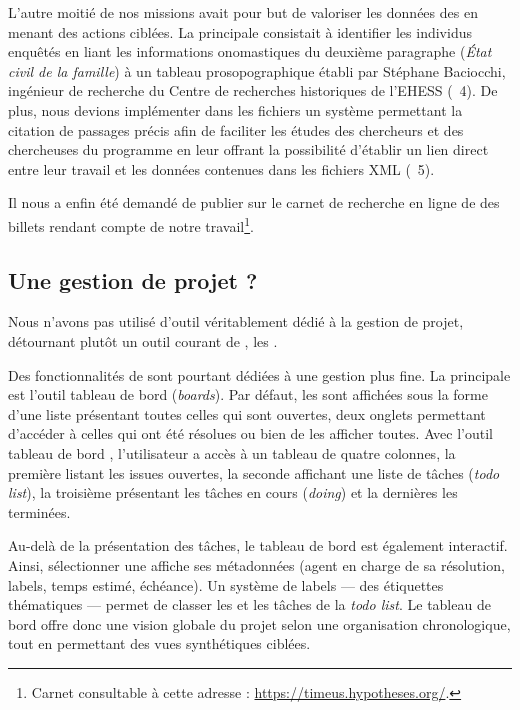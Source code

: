 L'autre moitié de nos missions avait pour but de valoriser les données des \odm{} en menant des actions ciblées. La principale consistait à identifier les individus enquêtés en liant les informations onomastiques du deuxième paragraphe (\textit{État civil de la famille}) à un tableau prosopographique établi par Stéphane Baciocchi, ingénieur de recherche du Centre de recherches historiques de l'EHESS (\issue{}~4). De plus, nous devions implémenter dans les fichiers un système permettant la citation de passages précis afin de faciliter les études des chercheurs et des chercheuses du programme en leur offrant la possibilité d'établir un lien direct entre leur travail et les données contenues dans les fichiers XML (\issue{}~5).

Il nous a enfin été demandé de publier sur le carnet de recherche en ligne de \timeus{} des billets rendant compte de notre travail\footnote{Carnet consultable à cette adresse : \url{https://timeus.hypotheses.org/}.}.

\subsection{Une gestion de projet ?}

Nous n'avons pas utilisé d'outil véritablement dédié à la gestion de projet, détournant plutôt un outil courant de \gitlab, les \issues.

Des fonctionnalités de \gitlab{} sont pourtant dédiées à une gestion plus fine. La principale est l'outil \og tableau de bord \fg{} (\textit{boards}). Par défaut, les \issues{} sont affichées sous la forme d'une liste présentant toutes celles qui sont ouvertes, deux onglets permettant d'accéder à celles qui ont été résolues ou bien de les afficher toutes. Avec l'outil \og tableau de bord \fg{}, l'utilisateur a accès à un tableau de quatre colonnes, la première listant les issues ouvertes, la seconde affichant une liste de tâches (\textit{todo list}), la troisième présentant les tâches en cours (\textit{doing}) et la dernières les \issues{} terminées.

Au-delà de la présentation des tâches, le tableau de bord est également interactif. Ainsi, sélectionner une \issue{} affiche ses métadonnées (agent en charge de sa résolution, labels, temps estimé, échéance). Un système de labels --- des étiquettes thématiques --- permet de classer les \issues{} et les tâches de la \textit{todo list}. Le tableau de bord offre donc une vision globale du projet selon une organisation chronologique, tout en permettant des vues synthétiques ciblées.

